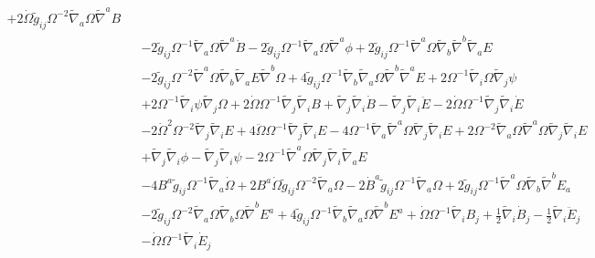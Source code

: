 \documentclass[10pt,letterpaper]{article}
\numberwithin{equation}{section}
\begin{document}
\begin{eqnarray}
+ 2 \dot{\Omega} \tilde{g}_{ij} \Omega^{-2} \tilde{\nabla}_{a}\Omega \tilde{\nabla}^{a}B\nonumber\\
&& - 2 \tilde{g}_{ij} \Omega^{-1} \tilde{\nabla}_{a}\Omega \tilde{\nabla}^{a}\dot{B}
- 2 \tilde{g}_{ij} \Omega^{-1} \tilde{\nabla}_{a}\Omega \tilde{\nabla}^{a}\phi
+ 2 \tilde{g}_{ij} \Omega^{-1} \tilde{\nabla}^{a}\Omega \tilde{\nabla}_{b}\tilde{\nabla}^{b}\tilde{\nabla}_{a}E\nonumber\\
&& - 2 \tilde{g}_{ij} \Omega^{-2} \tilde{\nabla}^{a}\Omega \tilde{\nabla}_{b}\tilde{\nabla}_{a}E \tilde{\nabla}^{b}\Omega
+ 4 \tilde{g}_{ij} \Omega^{-1} \tilde{\nabla}_{b}\tilde{\nabla}_{a}\Omega \tilde{\nabla}^{b}\tilde{\nabla}^{a}E
+ 2 \Omega^{-1} \tilde{\nabla}_{i}\Omega \tilde{\nabla}_{j}\psi\nonumber\\
&& + 2 \Omega^{-1} \tilde{\nabla}_{i}\psi \tilde{\nabla}_{j}\Omega
+ 2 \dot{\Omega} \Omega^{-1} \tilde{\nabla}_{j}\tilde{\nabla}_{i}B
+ \tilde{\nabla}_{j}\tilde{\nabla}_{i}\dot{B}
-  \tilde{\nabla}_{j}\tilde{\nabla}_{i}\ddot{E}
- 2 \dot{\Omega} \Omega^{-1} \tilde{\nabla}_{j}\tilde{\nabla}_{i}\dot{E}\nonumber\\
&& - 2 \dot{\Omega}^2 \Omega^{-2} \tilde{\nabla}_{j}\tilde{\nabla}_{i}E
+ 4 \ddot{\Omega} \Omega^{-1} \tilde{\nabla}_{j}\tilde{\nabla}_{i}E
- 4 \Omega^{-1} \tilde{\nabla}_{a}\tilde{\nabla}^{a}\Omega \tilde{\nabla}_{j}\tilde{\nabla}_{i}E
+ 2 \Omega^{-2} \tilde{\nabla}_{a}\Omega \tilde{\nabla}^{a}\Omega \tilde{\nabla}_{j}\tilde{\nabla}_{i}E\nonumber\\
&& + \tilde{\nabla}_{j}\tilde{\nabla}_{i}\phi
-  \tilde{\nabla}_{j}\tilde{\nabla}_{i}\psi
- 2 \Omega^{-1} \tilde{\nabla}^{a}\Omega \tilde{\nabla}_{j}\tilde{\nabla}_{i}\tilde{\nabla}_{a}E
\nonumber\\
&&-4 B^{a} \tilde{g}_{ij} \Omega^{-1} \tilde{\nabla}_{a}\dot{\Omega}
+ 2 B^{a} \dot{\Omega} \tilde{g}_{ij} \Omega^{-2} \tilde{\nabla}_{a}\Omega
- 2 \dot{B}^{a} \tilde{g}_{ij} \Omega^{-1} \tilde{\nabla}_{a}\Omega
+ 2 \tilde{g}_{ij} \Omega^{-1} \tilde{\nabla}^{a}\Omega \tilde{\nabla}_{b}\tilde{\nabla}^{b}E_{a}\nonumber\\
&& - 2 \tilde{g}_{ij} \Omega^{-2} \tilde{\nabla}_{a}\Omega \tilde{\nabla}_{b}\Omega \tilde{\nabla}^{b}E^{a}
+ 4 \tilde{g}_{ij} \Omega^{-1} \tilde{\nabla}_{b}\tilde{\nabla}_{a}\Omega \tilde{\nabla}^{b}E^{a}
+ \dot{\Omega} \Omega^{-1} \tilde{\nabla}_{i}B_{j}
+ \tfrac{1}{2} \tilde{\nabla}_{i}\dot{B}_{j}
-  \tfrac{1}{2} \tilde{\nabla}_{i}\ddot{E}_{j}\nonumber\\
&& -  \dot{\Omega} \Omega^{-1} \tilde{\nabla}_{i}\dot{E}_{j}

\end{eqnarray}
\end{document}
